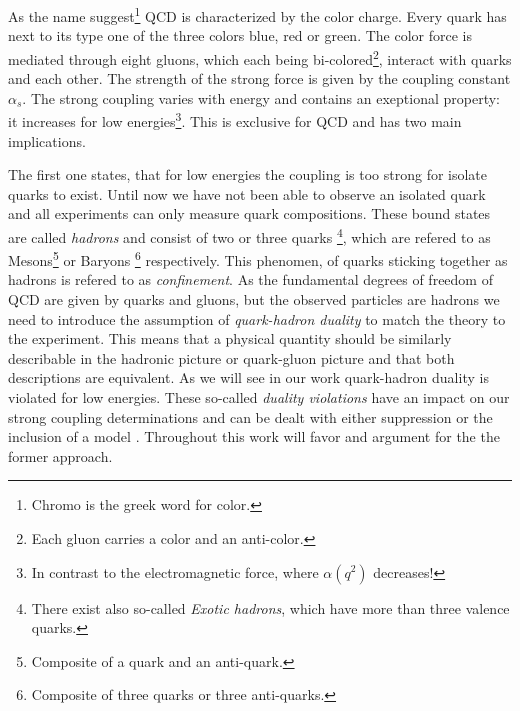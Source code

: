 \documentclass[../../index.tex]{subfiles}
\begin{document}
As the name suggest\footnote{Chromo is the greek word for color.} QCD
is characterized by the color charge. Every quark has next to its type one
of the three colors blue, red or green. The color force is mediated through
eight gluons, which each being bi-colored\footnote{Each gluon carries a color
  and an anti-color.}, interact with quarks and each other. The strength of the
strong force is given by the coupling constant $\alpha_s$. The strong coupling
varies with energy and contains an exeptional property: it increases for
low energies\footnote{In contrast to the electromagnetic force, where $\alpha(q^2)$
  decreases!}. This is exclusive for QCD and has two main implications.

The first one states, that for low energies the coupling is too strong for
isolate quarks to exist. Until now we have not been able to observe an isolated
quark and all experiments can only measure quark compositions. These bound
states are called \textit{hadrons} and consist of two or three quarks
\footnote{There exist also so-called \textit{Exotic hadrons}, which have more
  than three valence quarks.}, which are refered to as Mesons\footnote{Composite
  of a quark and an anti-quark.} or Baryons \footnote{Composite of three quarks
  or three anti-quarks.} respectively. This
phenomen, of quarks sticking together as hadrons is refered to as \textit{confinement}. 
As the fundamental degrees of freedom of QCD are given by quarks and gluons, but
the observed particles are hadrons we need to introduce the assumption of
\textit{quark-hadron duality} to match the theory to the experiment. This means that a physical quantity should be
similarly describable in the hadronic picture or quark-gluon picture and that
both descriptions are equivalent. As we will see in our work quark-hadron
duality is violated for low energies. These so-called \textit{duality
  violations} have an impact on our strong coupling determinations and can be
dealt with either suppression or the inclusion of a model
\cite{Pich2006,Cata2008}.
Throughout this work will favor and argument for the the former approach.
\end{document}
